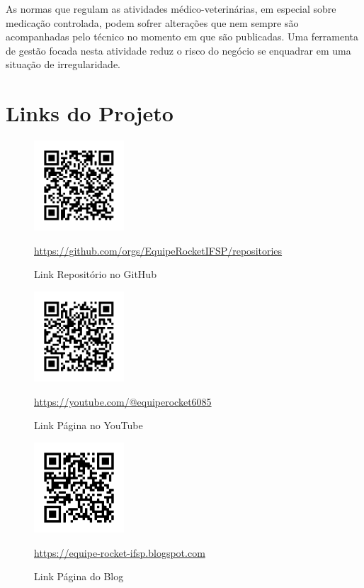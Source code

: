 \documentclass[
    12pt,               %
    openright,          %
    oneside,
    a4paper,            %
    BIBLATEX,           %
    TODO,               %
    english,            %
    brazil              %
    ]{ifsp-spo-inf-ctds}
\begin{document}
    As normas que regulam as atividades médico-veterinárias, em especial sobre medicação controlada, podem sofrer alterações que nem sempre são acompanhadas pelo técnico no momento em que são publicadas. Uma ferramenta de gestão focada nesta atividade reduz o risco do negócio se enquadrar em uma situação de irregularidade.

\chapter[Links do Projeto]{Links do Projeto}
    \begin{figure} [htb!]
        \centering
        \includegraphics[width=0.3\textwidth]{qrcode/qrcode_GIT.png}
        \caption{Link Repositório no GitHub}
        {\footnotesize \url{ https://github.com/orgs/EquipeRocketIFSP/repositories}}
        \label{fig:qrcode_GIT}
    \end{figure}

     \begin{figure}[htb!]
        \centering
        \includegraphics [width=0.3\textwidth]{qrcode/qrcode_YT.png}
        \caption{Link Página no YouTube}
        {\footnotesize \url{https://youtube.com/@equiperocket6085}}
        \label{fig:qrcode_YT}
    \end{figure}

    \begin{figure}[htb!]
        \centering
        \includegraphics[width=0.3\textwidth]{qrcode/qrcode_BLOG.png}
        \caption{Link Página do Blog}
        {\footnotesize \url{https://equipe-rocket-ifsp.blogspot.com}}
        \label{fig:qrcode_BLOG}
    \end{figure}
\end{document}
